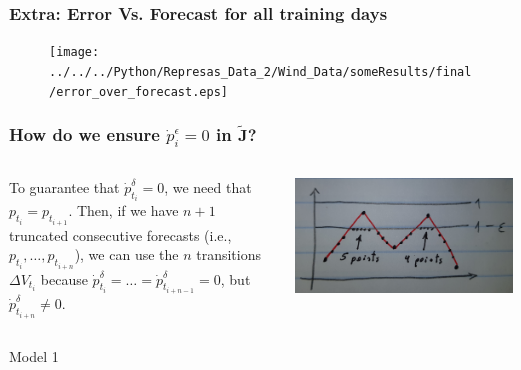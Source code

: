\documentclass[aspectratio=169]{beamer}\usepackage[utf8]{inputenc}
\begin{document}
\begin{frame}\frametitle{Extra: Error Vs. Forecast for all training days}

\begin{figure}[ht!]
\centering
\texttt{[image: ../../../Python/Represas\_Data\_2/Wind\_Data/someResults/final/error\_over\_forecast.eps]}
\end{figure}

\end{frame}


\begin{frame}\frametitle{How do we ensure $\dot{p}^\epsilon_i=0$ in $\tilde{\mathbf{J}}$?}

\begin{columns}


To guarantee that $\dot{p}^\delta_{t_i}=0$, we need that $p_{t_i}=p_{t_{i+1}}$. Then, if we have $n+1$ truncated consecutive forecasts (i.e., $p_{t_i},\dots,p_{t_{i+n}}$), we can use the $n$ transitions $\Delta V_{t_i}$ because $\dot{p}^\delta_{t_{i}}=\dots=\dot{p}^\delta_{t_{i+n-1}}=0$, but $\dot{p}^\delta_{t_{i+n}}\neq0$.

\includegraphics[width=0.9\columnwidth]{2.jpg}

\end{columns}

\end{frame}


\begin{frame}

{\Huge Model 1}

\end{frame}
\end{document}
